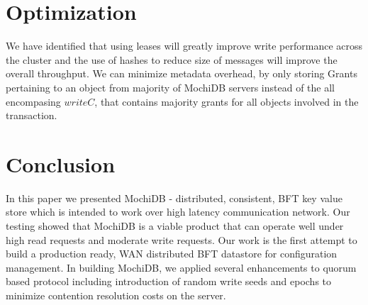 \documentclass[letterpaper,twocolumn,10pt]{article}
\begin{document}
\section{Optimization}
We have identified that using leases will greatly improve write performance across the cluster and the use of hashes to reduce size of messages will improve the overall throughput. We can minimize metadata overhead, by only storing Grants pertaining to an object from majority of MochiDB servers instead of the all encompasing $writeC$, that contains majority grants for all objects involved in the transaction.

\section{Conclusion}
In this paper we presented MochiDB - distributed, consistent, BFT key value store which is intended to work over high latency communication network. Our testing showed that MochiDB is a viable product that can operate well under high read requests and moderate write requests. Our work is the first attempt to build a production ready, WAN distributed BFT datastore for configuration management. In building MochiDB, we applied several enhancements to quorum based protocol including introduction of random write seeds and epochs to minimize contention resolution costs on the server.

{\footnotesize 
}
\end{document}
